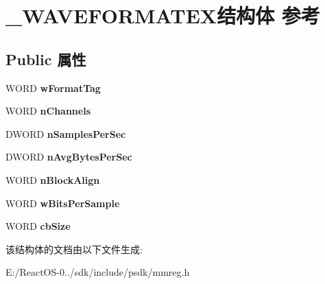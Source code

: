 \hypertarget{struct___w_a_v_e_f_o_r_m_a_t_e_x}{}\section{\+\_\+\+W\+A\+V\+E\+F\+O\+R\+M\+A\+T\+E\+X结构体 参考}
\label{struct___w_a_v_e_f_o_r_m_a_t_e_x}
\subsection*{Public 属性}
\begin{DoxyCompactItemize}
\item 
\mbox{\label{struct___w_a_v_e_f_o_r_m_a_t_e_x_aad36940bf15d5f17c71704da167e7aa2}} 
W\+O\+RD {\bfseries w\+Format\+Tag}
\item 
\mbox{\label{struct___w_a_v_e_f_o_r_m_a_t_e_x_a94e35980a2425061ab6b2496ec82bff6}} 
W\+O\+RD {\bfseries n\+Channels}
\item 
\mbox{\label{struct___w_a_v_e_f_o_r_m_a_t_e_x_a50741bd0426e5e555ca6c5ca881f301c}} 
D\+W\+O\+RD {\bfseries n\+Samples\+Per\+Sec}
\item 
\mbox{\label{struct___w_a_v_e_f_o_r_m_a_t_e_x_a48956d7b9220fcfdcc9e1a08807ec8b9}} 
D\+W\+O\+RD {\bfseries n\+Avg\+Bytes\+Per\+Sec}
\item 
\mbox{\label{struct___w_a_v_e_f_o_r_m_a_t_e_x_a0769182ea15301302dec3eacd028b4fd}} 
W\+O\+RD {\bfseries n\+Block\+Align}
\item 
\mbox{\label{struct___w_a_v_e_f_o_r_m_a_t_e_x_ab3569b8f940021df4a33ed8e971da146}} 
W\+O\+RD {\bfseries w\+Bits\+Per\+Sample}
\item 
\mbox{\label{struct___w_a_v_e_f_o_r_m_a_t_e_x_a3b77e4e28e6b377a0cfb40cb9775fe9d}} 
W\+O\+RD {\bfseries cb\+Size}
\end{DoxyCompactItemize}


该结构体的文档由以下文件生成\+:\begin{DoxyCompactItemize}
\item 
E\+:/\+React\+O\+S-\/0../sdk/include/psdk/mmreg.\+h\end{DoxyCompactItemize}
